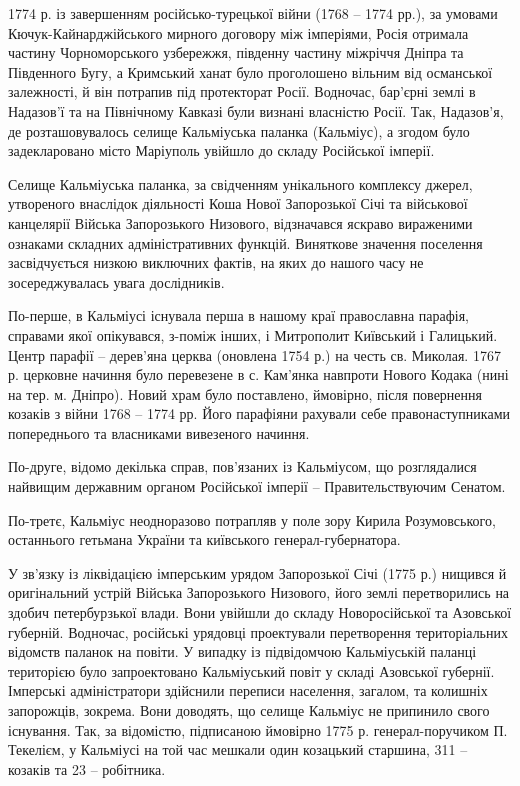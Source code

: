 1774 р. із завершенням  російсько-турецької війни (1768 – 1774 рр.), за умовами
Кючук-Кайнарджійського мирного договору між імперіями, Росія отримала частину
Чорноморського узбережжя, південну частину міжріччя Дніпра та Південного Бугу,
а Кримський ханат було проголошено вільним від османської залежності, й він
потрапив під протекторат Росії. Водночас, бар'єрні землі в Надазов'ї та на
Північному Кавказі були визнані власністю Росії. Так, Надазов'я, де
розташовувалось селище Кальміуська паланка (Кальміус), а згодом було
задекларовано місто Маріуполь увійшло до складу Російської імперії.

Селище Кальміуська паланка, за свідченням унікального комплексу джерел,
утвореного внаслідок діяльності Коша Нової Запорозької Січі та військової
канцелярії Війська Запорозького Низового, відзначався яскраво вираженими
ознаками складних адміністративних функцій. Виняткове значення поселення
засвідчується низкою виключних фактів, на яких до нашого часу не
зосереджувалась увага дослідників. 

По-перше, в Кальміусі існувала перша в нашому краї православна парафія,
справами якої опікувався, з-поміж інших,  і Митрополит Київський і Галицький.
Центр парафії – дерев'яна церква (оновлена 1754 р.) на честь св. Миколая. 1767
р. церковне начиння було перевезене в с. Кам'янка навпроти Нового Кодака (нині
на тер. м. Дніпро). Новий храм було поставлено, ймовірно, після повернення
козаків з війни 1768 – 1774 рр. Його парафіяни рахували себе правонаступниками
попереднього та власниками вивезеного начиння.


По-друге, відомо декілька справ, пов'язаних із Кальміусом, що розглядалися
найвищим державним органом Російської імперії – Правительствуючим Сенатом. 

По-третє, Кальміус неодноразово потрапляв у поле зору Кирила Розумовського,
останнього гетьмана України та київського генерал-губернатора.


У зв'язку із ліквідацією імперським урядом Запорозької Січі (1775 р.) нищився й
оригінальний устрій Війська Запорозького Низового, його землі перетворились на
здобич петербурзької влади. Вони увійшли до складу Новоросійської та Азовської
губерній. Водночас, російські урядовці проектували перетворення територіальних
відомств паланок на повіти. У випадку із підвідомчою Кальміуській паланці
територією було запроектовано Кальміуський повіт у складі Азовської губернії.
Імперські адміністратори здійснили переписи населення, загалом, та колишніх
запорожців, зокрема. Вони доводять, що селище Кальміус не припинило свого
існування. Так, за відомістю, підписаною ймовірно 1775 р. генерал-поручиком П.
Текелієм, у Кальміусі на той час мешкали один козацький старшина, 311 – козаків
та 23 – робітника. 

